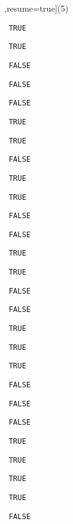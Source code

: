 \begin{solution}
\begin{sltasks}[counter-format=2.tsk[1],resume=true](5)
  \task
  \begin{items}
    \item \texttt{ TRUE }
    \item \texttt{ TRUE }
    \item \texttt{ FALSE }
    \item \texttt{ FALSE }
    \item \texttt{ FALSE }
  \end{items}
  \task
  \begin{items}
    \item \texttt{ TRUE }
    \item \texttt{ TRUE }
    \item \texttt{ FALSE }
    \item \texttt{ TRUE }
    \item \texttt{ TRUE }
  \end{items}
  \task
  \begin{items}
    \item \texttt{ FALSE }
    \item \texttt{ FALSE }
    \item \texttt{ TRUE }
    \item \texttt{ TRUE }
    \item \texttt{ FALSE }
  \end{items}
  \task
  \begin{items}
    \item \texttt{ FALSE }
    \item \texttt{ TRUE }
    \item \texttt{ TRUE }
    \item \texttt{ TRUE }
    \item \texttt{ FALSE }
  \end{items}
  \task
  \begin{items}
    \item \texttt{ FALSE }
    \item \texttt{ FALSE }
    \item \texttt{ TRUE }
    \item \texttt{ TRUE }
    \item \texttt{ TRUE }
  \end{items}
  \task
  \begin{items}
    \item \texttt{ TRUE }
    \item \texttt{ FALSE }

\end{items}
\end{sltasks}
\end{solution}
